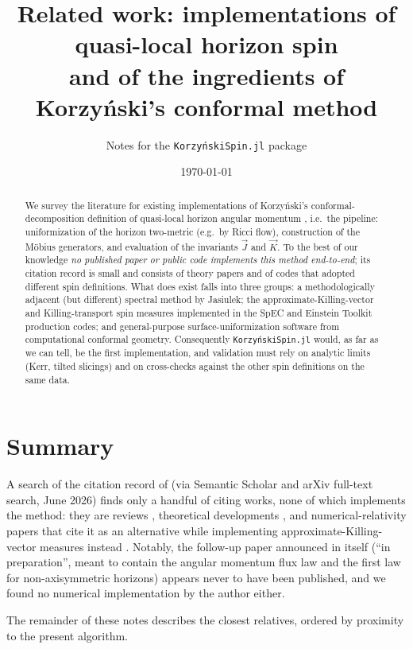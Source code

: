 \documentclass[11pt]{article}
\title{Related work: implementations of quasi-local horizon spin\\
and of the ingredients of Korzy\'nski's conformal method}
\author{Notes for the \texttt{KorzyńskiSpin.jl} package}
\date{\today}
\newcommand{\vJ}{\vec{J}}
\newcommand{\vK}{\vec{K}}
\begin{document}
\maketitle

\begin{abstract}
We survey the literature for existing implementations of Korzy\'nski's
conformal-decomposition definition of quasi-local horizon angular momentum
\cite{korzynski2007}, i.e.\ the pipeline: uniformization of the horizon
two-metric (e.g.\ by Ricci flow), construction of the M\"obius generators,
and evaluation of the invariants $\vJ$ and $\vK$.  To the best of our
knowledge \emph{no published paper or public code implements this method
end-to-end}; its citation record is small and consists of theory papers and
of codes that adopted different spin definitions.  What does exist falls into
three groups: a methodologically adjacent (but different) spectral method by
Jasiulek; the approximate-Killing-vector and Killing-transport spin measures
implemented in the SpEC and Einstein Toolkit production codes; and
general-purpose surface-uniformization software from computational conformal
geometry.  Consequently \texttt{KorzyńskiSpin.jl} would, as far as we can
tell, be the first implementation, and validation must rely on analytic
limits (Kerr, tilted slicings) and on cross-checks against the other spin
definitions on the same data.
\end{abstract}

\section{Summary}

A search of the citation record of \cite{korzynski2007} (via Semantic
Scholar and arXiv full-text search, June 2026) finds only a handful of
citing works, none of which implements the method: they are reviews
\cite{jaramillo2011,szabados2009}, theoretical developments
\cite{racz2024,ashtekar2022,booth2007}, and numerical-relativity papers that
cite it as an alternative while implementing approximate-Killing-vector
measures instead \cite{owen2017,lovelace2014}.  Notably, the follow-up paper
announced in \cite{korzynski2007} itself (``in preparation'', meant to
contain the angular momentum flux law and the first law for non-axisymmetric
horizons) appears never to have been published, and we found no numerical
implementation by the author either.

The remainder of these notes describes the closest relatives, ordered by
proximity to the present algorithm.
\end{document}
